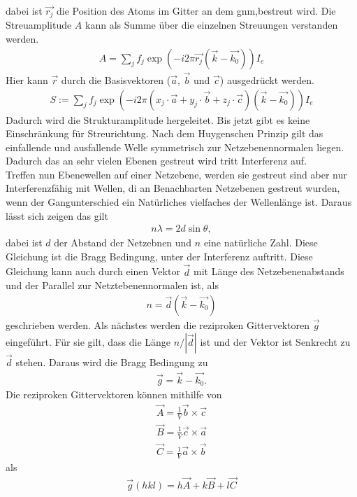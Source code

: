 dabei ist $\vec{r_j}$ die Position des Atoms im Gitter an dem gnm,bestreut wird. Die Streuamplitude $A$ kann als Summe über die einzelnen Streuungen verstanden werden.
\begin{align}
	A = \sum_j f_j \exp(-i2\pi\vec{r_j}\left(\vec{k}-\vec{k_0}\right))I_e
\end{align}
Hier kann $\vec{r}$ durch die Basisvektoren ($\vec{a}$, $\vec{b}$ und $\vec{c}$) ausgedrückt werden.
\begin{align}
	S:= \sum_j f_j \exp(-i2\pi\left(x_j\cdot\vec{a}+y_j\cdot\vec{b}+z_j\cdot\vec{c}\right)\left(\vec{k}-\vec{k_0}\right))I_e
\end{align}
Dadurch wird die Strukturamplitude hergeleitet. Bis jetzt gibt es keine Einschränkung für Streurichtung. Nach dem Huygenschen Prinzip gilt das einfallende und ausfallende Welle symmetrisch zur Netzebenennormalen liegen. Dadurch das an sehr vielen Ebenen gestreut wird tritt Interferenz auf.\\
Treffen nun Ebenewellen auf einer Netzebene, werden sie gestreut sind aber nur Interferenzfähig mit Wellen, di an Benachbarten Netzebenen gestreut wurden, wenn der Gangunterschied ein Natürliches vielfaches der Wellenlänge ist. Daraus lässt sich zeigen das gilt
\begin{align}
	n\lambda = 2d\sin\theta,\label{eq:Bragg}
\end{align}
dabei ist $d$ der Abstand der Netzebnen und $n$ eine natürliche Zahl. Diese Gleichung ist die Bragg Bedingung, unter der Interferenz auftritt. Diese Gleichung kann auch durch einen Vektor $\vec{d}$ mit Länge des Netzebenenabstands und der Parallel zur Netztebenennormalen ist, als
\begin{align}
	n=\vec{d}\left(\vec{k}-\vec{k_0}\right)
\end{align}
geschrieben werden. Als nächstes werden die reziproken Gittervektoren $\vec{g}$ eingeführt.
Für sie gilt, dass die Länge $n/|\vec{d}|$ ist und der Vektor ist Senkrecht zu $\vec{d}$ stehen. Daraus wird die Bragg Bedingung zu 
\begin{align}
	\vec{g}=\vec{k}-\vec{k_0}.
\end{align}
Die reziproken Gittervektoren können mithilfe von 
\begin{align*}
	\vec{A}=\frac{1}{V}\vec{b}\times\vec{c}\\
	\vec{B}=\frac{1}{V}\vec{c}\times\vec{a}\\
	\vec{C}=\frac{1}{V}\vec{a}\times\vec{b}
\end{align*}
als
\begin{align}
	\vec{g}(hkl)=h\vec{A}+k\vec{B}+l\vec{C}
\end{align}
